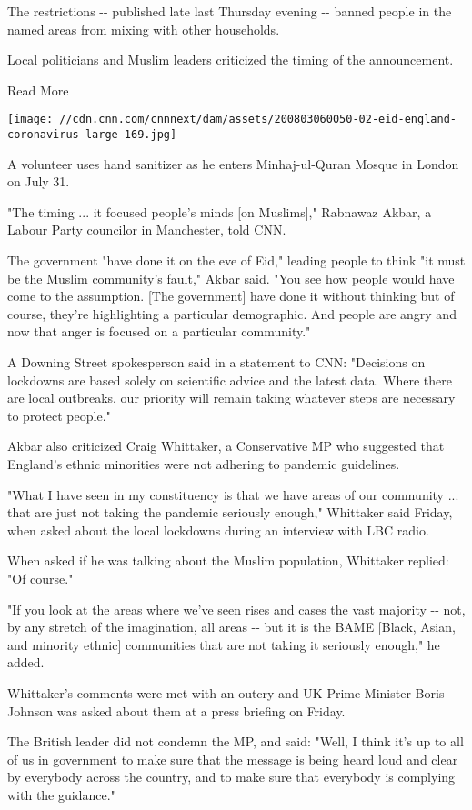 The restrictions -\/- published late last Thursday evening -\/- banned
people in the named areas from mixing with other households.

Local politicians and Muslim leaders criticized the timing of the
announcement.

Read More

\texttt{[image: //cdn.cnn.com/cnnnext/dam/assets/200803060050-02-eid-england-coronavirus-large-169.jpg]}

A volunteer uses hand sanitizer as he enters Minhaj-ul-Quran Mosque in
London on July 31.

"The timing ... it focused people's minds {[}on Muslims{]}," Rabnawaz
Akbar, a Labour Party councilor in Manchester, told CNN.

The government "have done it on the eve of Eid," leading people to think
"it must be the Muslim community's fault," Akbar said. "You see how
people would have come to the assumption. {[}The government{]} have done
it without thinking but of course, they're highlighting a particular
demographic. And people are angry and now that anger is focused on a
particular community."

A Downing Street spokesperson said in a statement to CNN: "Decisions on
lockdowns are based solely on scientific advice and the latest data.
Where there are local outbreaks, our priority will remain taking
whatever steps are necessary to protect people."

Akbar also criticized Craig Whittaker, a Conservative MP who suggested
that England's ethnic minorities were not adhering to pandemic
guidelines.

"What I have seen in my constituency is that we have areas of our
community ... that are just not taking the pandemic seriously enough,"
Whittaker said Friday, when asked about the local lockdowns during an
interview with LBC radio.

When asked if he was talking about the Muslim population, Whittaker
replied: "Of course."

"If you look at the areas where we've seen rises and cases the vast
majority -\/- not, by any stretch of the imagination, all areas -\/- but
it is the BAME {[}Black, Asian, and minority ethnic{]} communities that
are not taking it seriously enough," he added.

Whittaker's comments were met with an outcry and UK Prime Minister Boris
Johnson was asked about them at a press briefing on Friday.

The British leader did not condemn the MP, and said: "Well, I think it's
up to all of us in government to make sure that the message is being
heard loud and clear by everybody across the country, and to make sure
that everybody is complying with the guidance."

